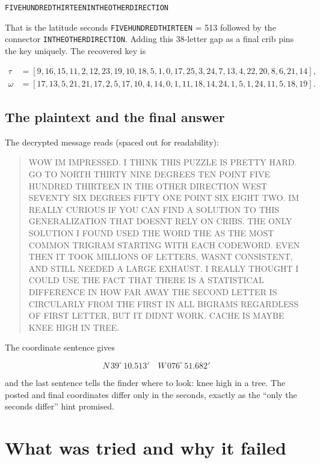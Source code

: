 \documentclass[11pt]{article}
\begin{document}
\begin{center}
\texttt{FIVEHUNDREDTHIRTEENINTHEOTHERDIRECTION}
\end{center}

That is the latitude seconds \texttt{FIVEHUNDREDTHIRTEEN} = 513 followed by
the connector \texttt{INTHEOTHERDIRECTION}.  Adding this 38-letter gap as a
final crib pins the key uniquely.  The recovered key is

\begin{align*}
\tau &= [9,16,15,11,2,12,23,19,10,18,5,1,0,17,25,3,24,7,13,4,22,20,8,6,21,14],\\
\omega &= [17,13,5,21,21,17,2,5,17,10,4,14,0,1,11,18,14,24,1,5,1,24,11,5,18,19].
\end{align*}

\subsection{The plaintext and the final answer}

The decrypted message reads (spaced out for readability):

\begin{quote}
WOW IM IMPRESSED. I THINK THIS PUZZLE IS PRETTY HARD. GO TO NORTH THIRTY NINE
DEGREES TEN POINT FIVE HUNDRED THIRTEEN IN THE OTHER DIRECTION WEST SEVENTY
SIX DEGREES FIFTY ONE POINT SIX EIGHT TWO. IM REALLY CURIOUS IF YOU CAN FIND
A SOLUTION TO THIS GENERALIZATION THAT DOESNT RELY ON CRIBS. THE ONLY SOLUTION
I FOUND USED THE WORD THE AS THE MOST COMMON TRIGRAM STARTING WITH EACH
CODEWORD. EVEN THEN IT TOOK MILLIONS OF LETTERS, WASNT CONSISTENT, AND STILL
NEEDED A LARGE EXHAUST. I REALLY THOUGHT I COULD USE THE FACT THAT THERE IS A
STATISTICAL DIFFERENCE IN HOW FAR AWAY THE SECOND LETTER IS CIRCULARLY FROM
THE FIRST IN ALL BIGRAMS REGARDLESS OF FIRST LETTER, BUT IT DIDNT WORK. CACHE
IS MAYBE KNEE HIGH IN TREE.
\end{quote}

The coordinate sentence gives

\begin{equation*}
\boxed{\;N\,39^\circ\,10.513' \quad W\,076^\circ\,51.682'\;}
\end{equation*}

and the last sentence tells the finder where to look: knee high in a tree.
The posted and final coordinates differ only in the seconds, exactly as the
``only the seconds differ'' hint promised.

\section{What was tried and why it failed}\label{sec:failed}
\end{document}

